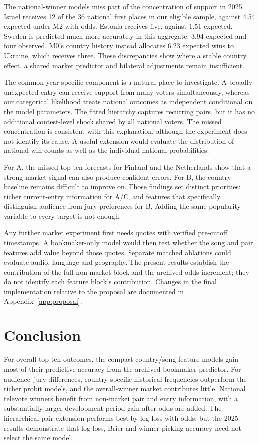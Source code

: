 \documentclass[11pt,a4paper]{article}
\begin{document}
The national-winner models miss part of the concentration of support in 2025. Israel receives 12 of the 36 national first places in our eligible sample, against 4.54 expected under M2 with odds. Estonia receives five, against 1.51 expected. Sweden is predicted much more accurately in this aggregate: 3.94 expected and four observed. M0's country history instead allocates 6.23 expected wins to Ukraine, which receives three. These discrepancies show where a stable country effect, a shared market predictor and bilateral adjustments remain insufficient.

The common year-specific component is a natural place to investigate. A broadly unexpected entry can receive support from many voters simultaneously, whereas our categorical likelihood treats national outcomes as independent conditional on the model parameters. The fitted hierarchy captures recurring pairs, but it has no additional contest-level shock shared by all national voters. The missed concentration is consistent with this explanation, although the experiment does not identify its cause. A useful extension would evaluate the distribution of national-win counts as well as the individual national probabilities.

For A, the missed top-ten forecasts for Finland and the Netherlands show that a strong market signal can also produce confident errors. For B, the country baseline remains difficult to improve on. Those findings set distinct priorities: richer current-entry information for A/C, and features that specifically distinguish audience from jury preferences for B. Adding the same popularity variable to every target is not enough.

Any further market experiment first needs quotes with verified pre-cutoff timestamps. A bookmaker-only model would then test whether the song and pair features add value beyond those quotes. Separate matched ablations could evaluate audio, language and geography. The present results establish the contribution of the full non-market block and the archived-odds increment; they do not identify each feature block's contribution. Changes in the final implementation relative to the proposal are documented in Appendix~\ref{app:proposal}.

\section{Conclusion}
For overall top-ten outcomes, the compact country/song feature models gain most of their predictive accuracy from the archived bookmaker predictor. For audience--jury differences, country-specific historical frequencies outperform the richer probit models, and the overall-winner market contributes little. National televote winners benefit from non-market pair and entry information, with a substantially larger development-period gain after odds are added. The hierarchical pair extension performs best by log loss with odds, but the 2025 results demonstrate that log loss, Brier and winner-picking accuracy need not select the same model.
\end{document}
